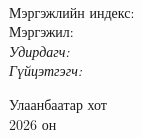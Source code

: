 \begin{titlepage}
\begin{center}

{\scshape\LARGE \univname\par} %
{\scshape\Large \facname\par}\vspace{0.5cm} %

\vspace{2cm}
\hfill \large{\deptname} \\

\vspace{2cm}

{\huge \bfseries \ttitle\par}\vspace{0.4cm} %

\vspace{2cm}

\begin{minipage}[t] {0.9\textwidth}
\begin{flushleft} 
\normalsize

Мэргэжлийн индекс: \degreeid \\
Мэргэжил: \degreename \\[2cm]

\emph{Удирдагч:} {\supname} \\%
\emph{Гүйцэтгэгч:} {\shortname} \\ %

\end{flushleft}
\end{minipage}

\vfill

\large {Улаанбаатар хот} \\
{\large 2026 он}\\ %

\end{center}
\end{titlepage}

 
